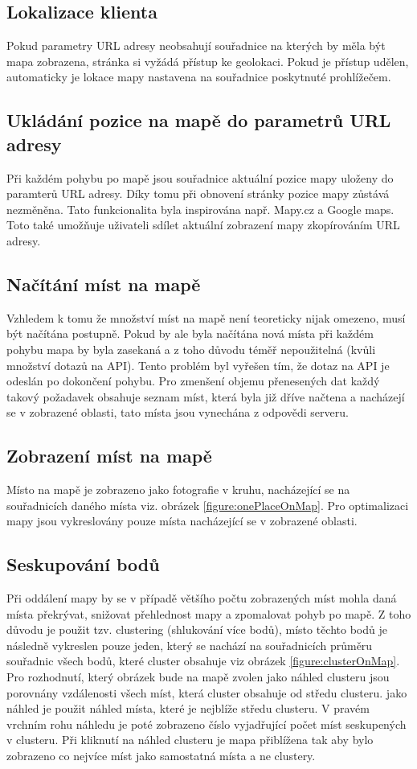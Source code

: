 \documentclass[12pt, a4paper,
 twoside,        %
 openright
]{report}
\begin{document}
    \subsection{Lokalizace klienta} Pokud parametry URL adresy neobsahují souřadnice na kterých by měla být mapa zobrazena, stránka si vyžádá přístup ke geolokaci. Pokud je přístup udělen, automaticky je lokace mapy nastavena na souřadnice poskytnuté prohlížečem.
    \subsection{Ukládání pozice na mapě do parametrů URL adresy}
    Při každém pohybu po mapě jsou souřadnice aktuální pozice mapy uloženy do paramterů URL adresy. Díky tomu při obnovení stránky pozice mapy zůstává nezměněna. Tato funkcionalita byla inspirována např. Mapy.cz a Google maps. Toto také umožňuje uživateli sdílet aktuální zobrazení mapy zkopírováním URL adresy.
    \subsection{Načítání míst na mapě}
    Vzhledem k tomu že množství míst na mapě není teoreticky nijak omezeno, musí být načítána postupně. Pokud by ale byla načítána nová místa při každém pohybu mapa by byla zasekaná a z toho důvodu téměř nepoužitelná (kvůli množství dotazů na API). Tento problém byl vyřešen tím, že dotaz na API je odeslán po dokončení pohybu. Pro zmenšení objemu přenesených dat každý takový požadavek obsahuje seznam míst, která byla již dříve načtena a nacházejí se v zobrazené oblasti, tato místa jsou vynechána z odpovědi serveru.
    \subsection{Zobrazení míst na mapě}
    Místo na mapě je zobrazeno jako fotografie v kruhu, nacházející se na souřadnicích daného místa viz. obrázek \ref{figure:onePlaceOnMap}. Pro optimalizaci mapy jsou vykreslovány pouze místa nacházející se v zobrazené oblasti.
    \subsection{Seskupování bodů}
    Při oddálení mapy by se v případě většího počtu zobrazených míst mohla daná místa překrývat, snižovat přehlednost mapy a zpomalovat pohyb po mapě. Z toho důvodu je použit tzv. clustering (shlukování více bodů), místo těchto bodů je následně vykreslen pouze jeden, který se nachází na souřadnicích průměru souřadnic všech bodů, které cluster obsahuje viz obrázek \ref{figure:clusterOnMap}. Pro rozhodnutí, který obrázek bude na mapě zvolen jako náhled clusteru jsou porovnány vzdálenosti všech míst, která cluster obsahuje od středu clusteru. jako náhled je použit náhled místa, které je nejblíže středu clusteru. V pravém vrchním rohu náhledu je poté zobrazeno číslo vyjadřující počet míst seskupených v clusteru. Při kliknutí na náhled clusteru je mapa přiblížena tak aby bylo zobrazeno co nejvíce míst jako samostatná místa a ne clustery.
\end{document}
